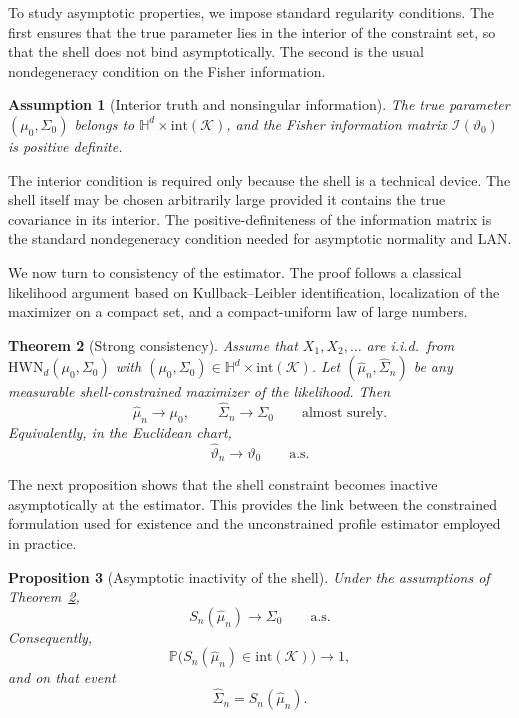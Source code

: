 \documentclass[11pt]{article}
\newtheorem{theorem}{Theorem}[section]
\newtheorem{proposition}[theorem]{Proposition}
\newtheorem{assumption}[theorem]{Assumption}
\newcommand{\Prob}{\mathbb{P}}
\newcommand{\Hh}{\mathbb{H}}
\newcommand{\shell}{\mathcal{K}}
\newcommand{\info}{\mathcal{I}}
\begin{document}
To study asymptotic properties, we impose standard regularity conditions. The first ensures that the true parameter lies in the interior of the constraint set, so that the shell does not bind asymptotically. The second is the usual nondegeneracy condition on the Fisher information.

\begin{assumption}[Interior truth and nonsingular information]
\label{ass:interior-info}
The true parameter $(\mu_0,\Sigma_0)$ belongs to $\Hh^d\times \mathrm{int}(\shell)$, and the Fisher information matrix $\info(\vartheta_0)$ is positive definite.
\end{assumption}

The interior condition is required only because the shell is a technical device. The shell itself may be chosen arbitrarily large provided it contains the true covariance in its interior. The positive-definiteness of the information matrix is the standard nondegeneracy condition needed for asymptotic normality and LAN.

We now turn to consistency of the estimator. The proof follows a classical likelihood argument based on Kullback--Leibler identification, localization of the maximizer on a compact set, and a compact-uniform law of large numbers.

\begin{theorem}[Strong consistency]
\label{thm:consistency}
Assume that $X_1,X_2,\dots$ are i.i.d.\ from $\mathrm{HWN}_d(\mu_0,\Sigma_0)$ with $(\mu_0,\Sigma_0)\in\Hh^d\times \mathrm{int}(\shell)$. Let $(\hat\mu_n,\hat\Sigma_n)$ be any measurable shell-constrained maximizer of the likelihood. Then
\[
\hat\mu_n\to \mu_0,
\qquad
\hat\Sigma_n\to \Sigma_0
\qquad\text{almost surely}.
\]
Equivalently, in the Euclidean chart,
\[
\hat\vartheta_n\to \vartheta_0
\qquad\text{a.s.}
\]
\end{theorem}


The next proposition shows that the shell constraint becomes inactive asymptotically at the estimator. This provides the link between the constrained formulation used for existence and the unconstrained profile estimator employed in practice.

\begin{proposition}[Asymptotic inactivity of the shell]
\label{prop:inactive-shell}
Under the assumptions of Theorem~\ref{thm:consistency},
\[
S_n(\hat\mu_n)\to \Sigma_0
\qquad\text{a.s.}
\]
Consequently,
\[
\Prob\bigl(S_n(\hat\mu_n)\in \mathrm{int}(\shell)\bigr)\to 1,
\]
and on that event
\[
\hat\Sigma_n=S_n(\hat\mu_n).
\]
\end{proposition}
\end{document}
